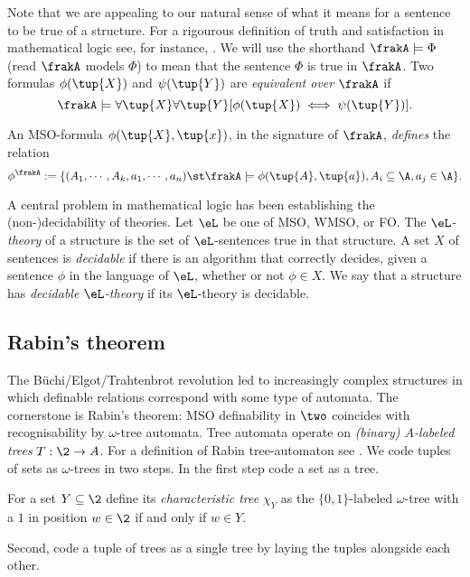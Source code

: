 Note that we are appealing to our natural sense of what it means for a
sentence to be true of a structure. 
For a rigourous definition of truth and satisfaction in
mathematical logic see, for instance, \cite{Bool07}. We will use the shorthand $\frakA \models \Phi$
(read $\frakA$ models $\Phi$) to mean that the sentence $\Phi$ is true in
$\frakA$. Two formulas $\phi(\tup{X})$ and $\psi(\tup{Y})$ are {\em equivalent over $\frakA$}
if \[\frakA \models \forall \tup{X} \forall \tup{Y} [\phi(\tup{X}) \iff \psi(\tup{Y})].\]

An MSO-formula $\phi(\tup{X},\tup{x})$, in the signature of $\frakA$,
{\em defines} the relation 
\[
\phi^\frakA := \{(A_1,\cdots,A_k,a_1,\cdots,a_n) \st \frakA \models \phi(\tup{A},\tup{a}), A_i \subseteq \A, a_j \in \A \}.
\]

A central problem in mathematical logic has been establishing  the (non-)decidability
of theories.
Let $\eL$ be one of MSO, WMSO, or FO. The {\em $\eL$-theory} of a structure is the set
of $\eL$-sentences true in that structure.  A set $X$ of sentences is {\em
decidable} if there is an algorithm that correctly decides, given a sentence
$\phi$ in the language of $\eL$, whether or not $\phi \in X$.  We say that a
structure has {\em decidable $\eL$-theory} if its $\eL$-theory is decidable.  

\subsection{Rabin's theorem}

The B\"uchi/Elgot/Trahtenbrot revolution led to increasingly complex
structures in which definable relations correspond with some type of automata. 
The cornerstone is Rabin's theorem: MSO definability in $\two$ coincides with recognisability by $\omega$-tree automata.
Tree automata operate on {\em (binary) $A$-labeled trees} $T:\2  \to A$. 
For a definition of Rabin tree-automaton see \cite{Thom90}. 
We code tuples of sets as $\omega$-trees in two steps. 
In the first step code a set as a tree.

\begin{definition} \label{AS:dfn:chartree}
For a set $Y \subseteq \2$ define
its {\em characteristic tree} $\chi_Y$ as the $\{0,1\}$-labeled $\omega$-tree with a $1$ in position $w \in \2$ if and only if $w \in Y$.
\end{definition}

Second, code a tuple of trees as a single tree by laying the tuples alongside each other.

